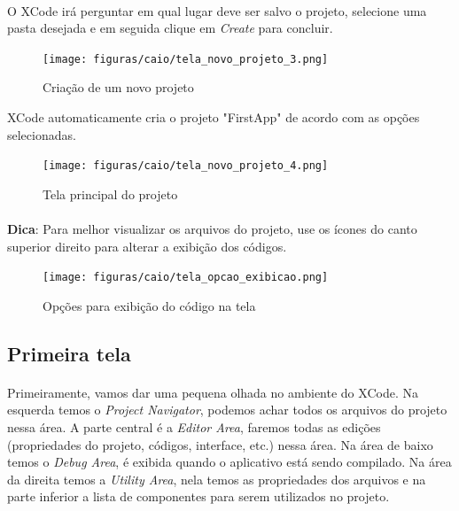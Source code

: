 \documentclass[a4paper,12pt,brazil,doubleside]{book}
\begin{document}
\begin{singlespace}
\paragraph{}O XCode irá perguntar em qual lugar deve ser salvo o projeto, selecione uma pasta desejada e em seguida clique em \emph{Create} para concluir. 

\begin{figure}[H]
  \centering
  \texttt{[image: figuras/caio/tela\_novo\_projeto\_3.png]}
  \caption{Criação de um novo projeto}
  \label{fig:a}
\end{figure}

XCode automaticamente cria o projeto "FirstApp" de acordo com as opções selecionadas.

\begin{figure}[H]
  \centering
  \texttt{[image: figuras/caio/tela\_novo\_projeto\_4.png]}
  \caption{Tela principal do projeto}
  \label{fig:a}
\end{figure}

\begin{framed}
\paragraph{}\textbf{Dica}: Para melhor visualizar os arquivos do projeto, use os ícones do canto superior direito para alterar a exibição dos códigos.
\end{framed}

\begin{figure}[H]
  \centering
  \texttt{[image: figuras/caio/tela\_opcao\_exibicao.png]}
  \caption{Opções para exibição do código na tela}
  \label{fig:a}
\end{figure}

\subsection{Primeira tela}

\paragraph{}Primeiramente, vamos dar uma pequena olhada no ambiente do XCode. Na esquerda temos o \emph{Project Navigator}, podemos achar todos os arquivos do projeto nessa área. A parte central é a \emph{Editor Area}, faremos todas as edições (propriedades do projeto, códigos, interface, etc.) nessa área. Na área de baixo temos o \emph{Debug Area}, é exibida quando o aplicativo está sendo compilado. Na área da direita temos a \emph{Utility Area}, nela temos as propriedades dos arquivos e na parte inferior a lista de componentes para serem utilizados no projeto.


\end{singlespace}
\end{document}
